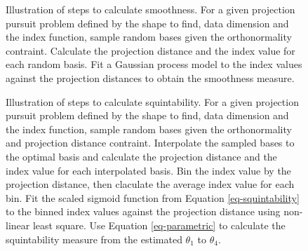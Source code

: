 \documentclass[
  number,
  preprint,
  3p]{elsarticle}
\begin{document}
\begin{figure}


\caption{\label{fig-smoothness}Illustration of steps to calculate
smoothness. For a given projection pursuit problem defined by the shape
to find, data dimension and the index function, sample random bases
given the orthonormality contraint. Calculate the projection distance
and the index value for each random basis. Fit a Gaussian process model
to the index values against the projection distances to obtain the
smoothness measure.}

\end{figure}%

\begin{figure}


\caption{\label{fig-squintability}Illustration of steps to calculate
squintability. For a given projection pursuit problem defined by the
shape to find, data dimension and the index function, sample random
bases given the orthonormality and projection distance contraint.
Interpolate the sampled bases to the optimal basis and calculate the
projection distance and the index value for each interpolated basis. Bin
the index value by the projection distance, then claculate the average
index value for each bin. Fit the scaled sigmoid function from Equation
\ref{eq-squintability} to the binned index values against the projection
distance using non-linear least square. Use Equation \ref{eq-parametric}
to calculate the squintability measure from the estimated \(\theta_1\)
to \(\theta_4\).}

\end{figure}%
\end{document}
